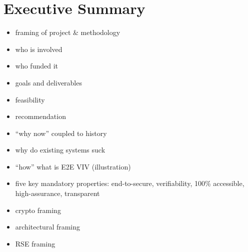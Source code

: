 \chapter{Executive Summary}
\label{chapter:executive_summary}

\begin{itemize}
\item framing of project \& methodology
\item who is involved
\item who funded it
\item goals and deliverables
\item feasibility
\item recommendation
\item ``why now'' coupled to history
\item why do existing systems suck
\item ``how'' what is E2E VIV (illustration)
\item five key mandatory properties: end-to-secure, verifiability,
  100\% accessible, high-assurance, transparent
\item crypto framing
\item architectural framing
\item RSE framing
\end{itemize}